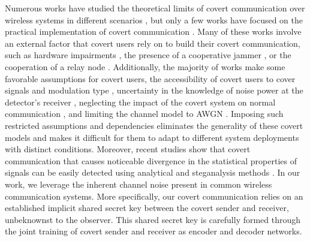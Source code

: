 Numerous works have studied the theoretical limits of covert communication over wireless systems in different scenarios \cite{bash2012square, soltani2018covert, sheikholeslami2018multi, li2021fundamental}, but only a few works have focused on the practical implementation of covert communication \cite{dutta2012secret, cao2018wireless, liao2020generative, mohammed2021adversarial}. Many of these works involve an external factor that covert users rely on to build their covert communication, such as hardware impairments \cite{mohammed2021adversarial}, the presence of a cooperative jammer \cite{sobers2017covert}, or the cooperation of a relay node \cite{liao2020generative, kim2022covert}. Additionally, the majority of works make some favorable assumptions for covert users, the accessibility of covert users to cover signals and modulation type \cite{grzesiak2021wireless}, uncertainty in the knowledge of noise power at the detector's receiver \cite{he2017covert}, neglecting the impact of the covert system on normal communication \cite{mohammed2021adversarial}, and limiting the channel model to AWGN \cite{mohammed2021adversarial}. Imposing such restricted assumptions and dependencies eliminates the generality of these covert models and makes it difficult for them to adapt to different system deployments with distinct conditions. Moreover, recent studies show that covert communication that causes noticeable divergence in the statistical properties of signals can be easily detected using analytical and steganalysis methods \cite{bahramali2021robust, huang2020exploiting}. In our work, we leverage the inherent channel noise present in common wireless communication systems. More specifically, our covert communication relies on an established implicit shared secret key between the covert sender and receiver, unbeknownst to the observer. This shared secret key is carefully formed through the joint training of covert sender and receiver as encoder and decoder networks.

